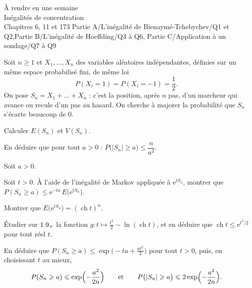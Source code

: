 
  {À rendre en une semaine\\Inégalités de concentration\\Chapitres 6, 11 et 17}{3}
  {Partie A/L'inégalité de Bienaymé-Tchebychev/Q1 et Q2,Partie B/L'inégalité de Hoeffding/Q3 à Q6,%
   Partie C/Application à un sondage/Q7 à Q9}
\enParties
{}

Soit $n\geqslant1$ et $X_1,\dots,X_n$ des variables aléatoires
indépendantes, définies sur un même espace probabilisé fini, de même loi
\[P(X_i=1)=P(X_i=-1)=\frac12.\]
On pose $S_n=X_1+\dots+X_n$ : c'est la position, après $n$ pas, d'un
marcheur qui avance ou recule d'un pas au hasard. On cherche à majorer la
probabilité que $S_n$ s'écarte beaucoup de $0$.

\begin{exoEval}{}{}
\begin{questions}
  \item Calculer $E(S_n)$ et $V(S_n)$.
  \item En déduire que pour tout $a>0$ :
    $P\bigl(|S_n|\geqslant a\bigr)\leqslant\dfrac{n}{a^{2}}$.
\end{questions}
\end{exoEval}

\begin{exoEval}{}{}
Soit $a>0$.
\begin{questions}[start=3]
  \item Soit $t>0$. À l'aide de l'inégalité de Markov appliquée à
    $\mathrm{e}^{tS_n}$, montrer que
    $P(S_n\geqslant a)\leqslant\mathrm{e}^{-ta}\,E\bigl(\mathrm{e}^{tS_n}\bigr)$.
  \item Montrer que $E\bigl(\mathrm{e}^{tS_n}\bigr)=(\operatorname{ch}t)^{n}$.
  \item Étudier sur $1.9_{+}$ la fonction
    $g:t\mapsto\frac{t^{2}}{2}-\ln(\operatorname{ch}t)$, et en déduire que
    $\operatorname{ch}t\leqslant\mathrm{e}^{t^{2}/2}$ pour tout réel $t$.
  \item En déduire que $P(S_n\geqslant a)\leqslant\exp\bigl(-ta+\frac{nt^{2}}{2}\bigr)$
    pour tout $t>0$, puis, en choisissant $t$ au mieux,
    \[P(S_n\geqslant a)\leqslant\exp\Bigl(-\frac{a^{2}}{2n}\Bigr)\qquad\text{et}\qquad
      P\bigl(|S_n|\geqslant a\bigr)\leqslant2\exp\Bigl(-\frac{a^{2}}{2n}\Bigr).\]
\end{questions}
\end{exoEval}

